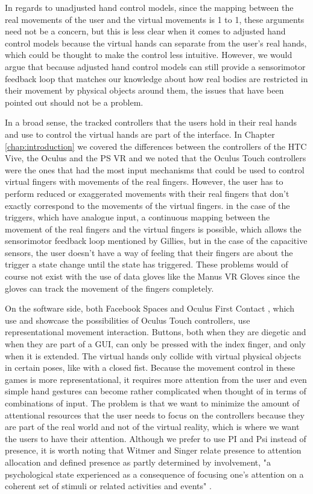 In regards to unadjusted hand control models, since the mapping between the real movements of the user and the virtual movements is 1 to 1, these arguments need not be a concern, but this is less clear when it comes to adjusted hand control models because the virtual hands can separate from the user's real hands, which could be thought to make the control less intuitive. However, we would argue that because adjusted hand control models can still provide a sensorimotor feedback loop \parencite{Gillies2014} that matches our knowledge about how real bodies are restricted in their movement by physical objects around them, the issues that have been pointed out should not be a problem.

In a broad sense, the tracked controllers that the users hold in their real hands and use to control the virtual hands are part of the interface. In Chapter \ref{chap:introduction} we covered the differences between the controllers of the HTC Vive, the Oculus and the PS VR and we noted that the Oculus Touch controllers were the ones that had the most input mechanisms that could be used to control virtual fingers with movements of the real fingers. However, the user has to perform reduced or exaggerated movements with their real fingers that don't exactly correspond to the movements of the virtual fingers. in the case of the triggers, which have analogue input, a continuous mapping between the movement of the real fingers and the virtual fingers is possible, which allows the sensorimotor feedback loop mentioned by Gillies, but in the case of the capacitive sensors, the user doesn't have a way of feeling that their fingers are about the trigger a state change until the state has triggered. These problems would of course not exist with the use of data gloves like the Manus VR Gloves since the gloves can track the movement of the fingers completely.

On the software side, both Facebook Spaces \parencite{facebookSpaces} and Oculus First Contact \parencite{firstContact}, which use and showcase the possibilities of Oculus Touch controllers, use representational movement interaction. Buttons, both when they are diegetic and when they are part of a GUI, can only be pressed with the index finger, and only when it is extended. The virtual hands only collide with virtual physical objects in certain poses, like with a closed fist. Because the movement control in these games is more representational, it requires more attention from the user and even simple hand gestures can become rather complicated when thought of in terms of combinations of input. The problem is that we want to minimize the amount of attentional resources that the user needs to focus on the controllers because they are part of the real world and not of the virtual reality, which is where we want the users to have their attention. Although we prefer to use PI and Psi instead of presence, it is worth noting that Witmer and Singer relate presence to attention allocation and defined presence as partly determined by involvement, "a psychological state experienced as a consequence of focusing one’s attention on a coherent set of stimuli or related activities and events" \parencite{Schuemie2001}.

